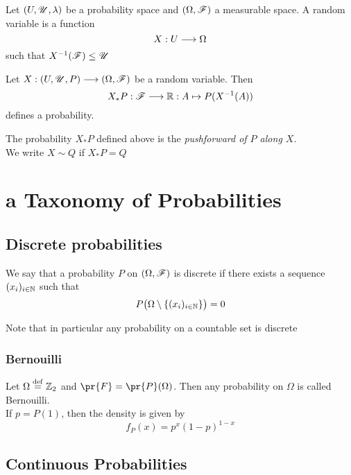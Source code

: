 \begin{definition}
\label{definition:random_variable}
Let $(U, \r{U}, \lambda)$ be a probability space and $(\Omega, \r{F})$ a measurable space. A random variable is a function
\[
X: U\longrightarrow \Omega
\]
such that $X^{-1}(\r{F})\le \r{U}$
\end{definition}

\begin{lemma}
\label{lemma:pushforward}
Let $X: (U, \r{U}, P)\mor (\Omega, \r{F})$ be a random variable. Then
\[
X_*P: \r{F}\mor \d{R}:  A\fun P(X^{-1}(A)) 
\]
defines a probability.
\end{lemma}

\begin{definition}
\label{definition:pushfoward}
The probability $X_*P$ defined above is the \emph{pushforward of $P$ along $X$}.\\
We write $X\sim Q$ if $X_*P =Q$
\end{definition}
\section{a Taxonomy of Probabilities}
\subsection{Discrete probabilities}
\begin{definition}
We say that a probability $P$ on $(\Omega,\r{F})$ is discrete if there exists a sequence $(x_i)_{i \in \mathbb{N}}$ such that
\[
P\big(\Omega\setminus\{(x_i)_{i \in \mathbb{N}}\}\big)=0
\]
\end{definition}
Note that in particular any probability on a countable set is discrete
\subsubsection{Bernouilli}
\begin{definition}
Let $\Omega\stackrel{\operatorname{def}}{=} \mathbb{Z}_2$ and $\pr{F}=\pr{P}(\Omega)$. Then any probability on $\Omega$ is called Bernouilli.\\
If $p=P(1)$, then the density is given by
\[
f_P(x) = p^x(1-p)^{1-x}
\]
\end{definition}


\subsection{Continuous Probabilities}



